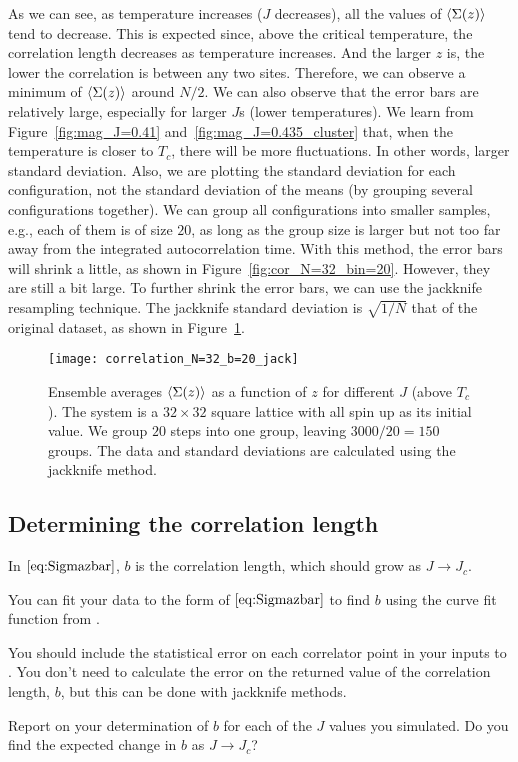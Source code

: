 As we can see, as temperature increases (\(J\) decreases), all the values of
\(\expval{\Sigma(z)}\) tend to decrease.
This is expected since, above the critical temperature, the correlation length
decreases as temperature increases.
And the larger \(z\) is, the lower the correlation is between any two sites.
Therefore, we can observe a minimum of \(\expval{\Sigma(z)}\) around \(N / 2\).
We can also observe that the error bars are relatively large, especially for
larger \(J\)s (lower temperatures).
We learn from Figure~\ref{fig:mag_J=0.41} and~\ref{fig:mag_J=0.435_cluster}
that, when the temperature is closer to \(T_c\), there will be more fluctuations.
In other words, larger standard deviation.
Also, we are plotting the standard deviation for each configuration,
not the standard deviation of the means (by grouping several configurations together).
We can group all configurations into smaller samples, e.g., each of them
is of size \(20\), as long as the group size is larger but not too far away from
the integrated autocorrelation time. With this method, the error bars will shrink
a little, as shown in Figure~\ref{fig:cor_N=32_bin=20}.
However, they are still a bit large. To further shrink the error bars,
we can use the jackknife resampling technique.
The jackknife standard deviation is \(\sqrt{1 / N}\) that of the original dataset,
as shown in Figure~\ref{fig:cor_N=32_bin=20_jack}.

\begin{figure}
    \centering
    \texttt{[image: correlation\_N=32\_b=20\_jack]}
    \caption{Ensemble averages \(\expval{\Sigma(z)}\) as a function of \(z\) for different
        \(J\) (above \(T_c\)). The system is a \(32 \times 32\) square lattice
        with all spin up as its initial value.
        We group \(20\) steps into one group, leaving \(3000 / 20 = 150\) groups.
        The data and standard deviations are calculated using the jackknife method.}
    \label{fig:cor_N=32_bin=20_jack}
\end{figure}

\subsection{Determining the correlation length}

In \(\eqref{eq:Sigmazbar}\), \(b\) is the correlation length, which should grow as
\(J \rightarrow J_c\).

\Question{} You can fit your data to the form of \(\eqref{eq:Sigmazbar}\) to find \(b\)
using the curve fit function  from
\href{https://github.com/JuliaNLSolvers/LsqFit.jl}{}.

You should include the statistical error on each correlator point in your inputs to
.
You don't need to calculate the error on the returned value of the correlation length,
\(b\), but this can be done with jackknife methods.

Report on your determination of \(b\) for each of the \(J\) values you
simulated. Do you find the expected change in \(b\) as \(J \rightarrow J_c\)?
